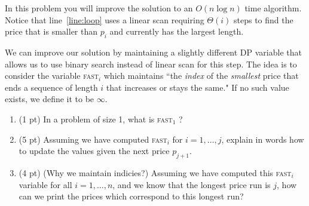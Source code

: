 \documentclass[11pt]{article}
\begin{document}
In this problem you will improve the solution to an $O(n\log n)$ time algorithm.  Notice that line~\ref{line:loop} uses a linear scan requiring $\Theta(i)$ steps to find the price that is smaller than  $p_i$ and currently has the largest length.

We can improve our solution by maintaining a slightly different DP variable that allows us to use binary search instead of linear scan for this step.  The idea is to consider the variable \textsc{fast}$_{i}$ which maintains ``the \emph{index} of the {\em smallest} price that ends a sequence of length $i$ that increases or stays the same."  If no such value exists, we define it to be $\infty$.


\begin{enumerate}
  \item (1 pt) In a problem of size 1, what is \textsc{fast}$_1$ ?

  \item (5 pt) Assuming we have computed \textsc{fast}$_i$ for $i=1,\ldots,j$,
  explain in words how to update the values given the next price $p_{j+1}$.

  \item (4 pt) (Why we maintain indicies?)  Assuming we have computed this 
  \textsc{fast}$_i$ variable for all $i=1,\ldots,n$, and we know that
  the longest price run is $j$, how can we print the prices which correspond to this longest run?


\end{enumerate}
\end{document}

